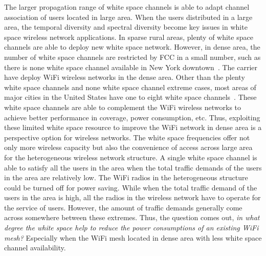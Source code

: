 The larger propagation range of white space channels is able to adapt channel association of 
users located in large area. 
When the users distributed in a large area, the temporal diversity and spectral diversity become 
 key issues in white space wireless network applications. 
In sparse rural areas, plenty of white space channels are able to deploy new white space network. 
However, in dense area, the number of  white space channels are restricted by FCC in a small number, 
such as there is none white space channel available in New York downtown~\cite{googlespectrum}. 
The carrier have deploy WiFi wireless networks in the dense area. 
Other than the plenty white space channels and none white space channel extreme cases, most areas 
of major cities in the United States have one to eight 
white space channels~\cite{googlespectrum}. 
These white space channels are able to complement the WiFi wireless networks to achieve better 
performance in coverage, power consumption, etc. Thus, exploiting these limited white space resource 
to improve the WiFi network in dense area is a perspective option for wireless networks. 
The white space frequencies offer not only more wireless capacity but also the convenience of access 
across large area for the heterogeneous wireless network structure. 
A single white space channel is able to satisfy all the users in the area when the total traffic demands of 
the users in the area are relatively low. The WiFi radios in the heterogeneous structure could be turned off 
for power saving. 
While when the total traffic demand of the users in the area is high, all the radios in the wireless network 
have to operate for the service of users.
However, the amount of traffic demands generally come across somewhere between these extremes. Thus, the 
question comes out, {\it in what degree the white space help to reduce the power consumptions of an existing 
WiFi mesh?} Especially when the WiFi mesh located in dense area with less white space channel availability.





